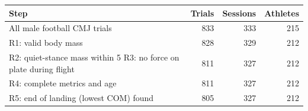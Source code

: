 \begin{tabular}{lrrr}
\toprule
Step & Trials & Sessions & Athletes \\
\midrule
All male football CMJ trials & 833 & 333 & 215 \\
R1: valid body mass & 828 & 329 & 212 \\
R2: quiet-stance mass within 5%
R3: no force on plate during flight & 811 & 327 & 212 \\
R4: complete metrics and age & 811 & 327 & 212 \\
R5: end of landing (lowest COM) found & 805 & 327 & 212 \\
\bottomrule
\end{tabular}

